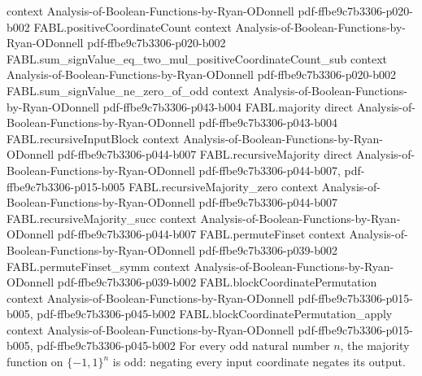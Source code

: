 \begin{theorem}
  {context}
  {Analysis-of-Boolean-Functions-by-Ryan-ODonnell}
  {pdf-ffbe9c7b3306-p020-b002}
\proofstep
  {FABL.positiveCoordinateCount}
  {context}
  {Analysis-of-Boolean-Functions-by-Ryan-ODonnell}
  {pdf-ffbe9c7b3306-p020-b002}
\proofstep
  {FABL.sum_signValue_eq_two_mul_positiveCoordinateCount_sub}
  {context}
  {Analysis-of-Boolean-Functions-by-Ryan-ODonnell}
  {pdf-ffbe9c7b3306-p020-b002}
\proofstep
  {FABL.sum_signValue_ne_zero_of_odd}
  {context}
  {Analysis-of-Boolean-Functions-by-Ryan-ODonnell}
  {pdf-ffbe9c7b3306-p043-b004}
\proofstep
  {FABL.majority}
  {direct}
  {Analysis-of-Boolean-Functions-by-Ryan-ODonnell}
  {pdf-ffbe9c7b3306-p043-b004}
\proofstep
  {FABL.recursiveInputBlock}
  {context}
  {Analysis-of-Boolean-Functions-by-Ryan-ODonnell}
  {pdf-ffbe9c7b3306-p044-b007}
\proofstep
  {FABL.recursiveMajority}
  {direct}
  {Analysis-of-Boolean-Functions-by-Ryan-ODonnell}
  {pdf-ffbe9c7b3306-p044-b007,
    pdf-ffbe9c7b3306-p015-b005}
\proofstep
  {FABL.recursiveMajority_zero}
  {context}
  {Analysis-of-Boolean-Functions-by-Ryan-ODonnell}
  {pdf-ffbe9c7b3306-p044-b007}
\proofstep
  {FABL.recursiveMajority_succ}
  {context}
  {Analysis-of-Boolean-Functions-by-Ryan-ODonnell}
  {pdf-ffbe9c7b3306-p044-b007}
\proofstep
  {FABL.permuteFinset}
  {context}
  {Analysis-of-Boolean-Functions-by-Ryan-ODonnell}
  {pdf-ffbe9c7b3306-p039-b002}
\proofstep
  {FABL.permuteFinset_symm}
  {context}
  {Analysis-of-Boolean-Functions-by-Ryan-ODonnell}
  {pdf-ffbe9c7b3306-p039-b002}
\proofstep
  {FABL.blockCoordinatePermutation}
  {context}
  {Analysis-of-Boolean-Functions-by-Ryan-ODonnell}
  {pdf-ffbe9c7b3306-p015-b005,
    pdf-ffbe9c7b3306-p045-b002}
\proofstep
  {FABL.blockCoordinatePermutation_apply}
  {context}
  {Analysis-of-Boolean-Functions-by-Ryan-ODonnell}
  {pdf-ffbe9c7b3306-p015-b005,
    pdf-ffbe9c7b3306-p045-b002}
For every odd natural number $n$, the majority function on $\{-1,1\}^n$ is odd: negating
every input coordinate negates its output.
\end{theorem}

